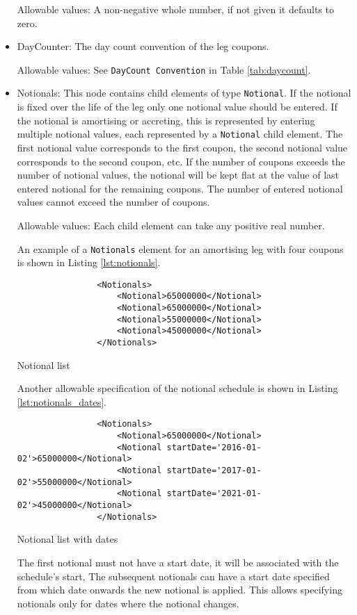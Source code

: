 \begin{itemize}
Allowable values: A non-negative whole number, if not given it defaults to zero.

\item DayCounter: The day count convention of the leg coupons. 

Allowable values: See \lstinline!DayCount Convention! in Table \ref{tab:daycount}.

\item Notionals: This node contains child elements of type
  \lstinline!Notional!. If the notional is fixed over the life of the
  leg only one notional value should be entered. If the notional is
  amortising or accreting, this is represented by entering multiple
  notional values, each represented by a \lstinline!Notional! child
  element. The first notional value corresponds to the first coupon,
  the second notional value corresponds to the second coupon, etc. If
  the number of coupons exceeds the number of notional values, the
  notional will be kept flat at the value of last entered notional for
  the remaining coupons.  The number of entered notional values cannot
  exceed the number of coupons.

Allowable values: Each child element can take any positive real number.

\vspace{1em}

An example of a \lstinline!Notionals! element for an amortising leg with four coupons is shown in Listing \ref{lst:notionals}.
\begin{listing}[H]
\begin{verbatim}
                <Notionals>
                    <Notional>65000000</Notional>
                    <Notional>65000000</Notional>
                    <Notional>55000000</Notional>
                    <Notional>45000000</Notional>
                </Notionals>
\end{verbatim}
\caption{Notional list}
\label{lst:notionals}
\end{listing}

Another allowable specification of the notional schedule is shown in Listing \ref{lst:notionals_dates}. 
\begin{listing}[H]
\begin{verbatim}
                <Notionals>
                    <Notional>65000000</Notional>
                    <Notional startDate='2016-01-02'>65000000</Notional>
                    <Notional startDate='2017-01-02'>55000000</Notional>
                    <Notional startDate='2021-01-02'>45000000</Notional>
                </Notionals>
\end{verbatim}
\caption{Notional list with dates}
\label{lst:notionals_dates}
\end{listing}
The first notional must not have a start date, it will be associated
with the schedule's start, The subsequent notionals can have a start
date specified from which date onwards the new notional is applied. This allows
specifying notionals only for dates where the notional changes. 


\end{itemize}
